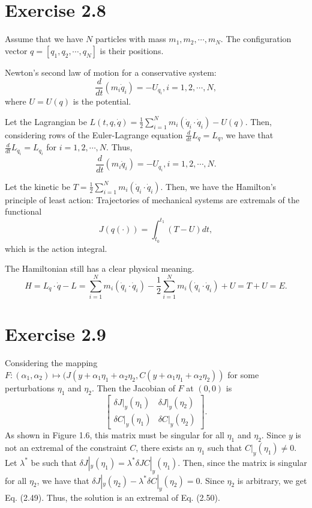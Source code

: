 \documentclass[11pt]{report}
\begin{document}

\section*{Exercise 2.8}
Assume that we have $N$ particles with mass $m_1, m_2, \cdots, m_N$. The configuration vector $q = [q_1, q_2, \cdots, q_N]$ is their positions.

Newton’s second law of motion for a conservative system:
\[
\frac{d}{dt} (m_i\dot{q}_i) = -U_{q_i}, i = 1, 2, \cdots, N,
\]
where $U = U(q)$ is the potential.

Let the Lagrangian be $L(t, q, \dot{q}) = \frac{1}{2}\sum_{i=1}^{N} m_i \left(\dot{q}_i \cdot \dot{q}_i\right) - U(q)$. Then, considering rows of the Euler-Lagrange equation $\frac{d}{dt}L_{\dot{q}} = L_q$, we have that $\frac{d}{dt}L_{\dot{q}_i} = L_{q_i}$ for $i = 1, 2, \cdots, N$. Thus,
\[
\frac{d}{dt} (m_i\dot{q}_i) = -U_{q_i}, i = 1, 2, \cdots, N.
\]

Let the kinetic be $T = \frac{1}{2}\sum_{i=1}^{N} m_i \left(\dot{q}_i \cdot \dot{q}_i\right)$. Then, we have the Hamilton’s principle of least action: Trajectories of mechanical systems are extremals of the functional
\[
J(q(\cdot)) = \int_{t_0}^{t_1} (T - U) dt,
\]
which is the action integral.

The Hamiltonian still has a clear physical meaning.
\[
H = L_{\dot{q}} \cdot \dot{q} - L = \sum_{i=1}^{N} m_i \left(\dot{q}_i \cdot \dot{q}_i\right) - \frac{1}{2}\sum_{i=1}^{N} m_i \left(\dot{q}_i \cdot \dot{q}_i\right) + U = T + U = E.
\]

\section*{Exercise 2.9}
Considering the mapping $F : (\alpha_1, \alpha_2) \mapsto (J(y + \alpha_1 \eta_1 + \alpha_2 \eta_2, C(y + \alpha_1 \eta_1 + \alpha_2 \eta_2))$ for some perturbations $\eta_1$ and $\eta_2$. Then the Jacobian of $F$ at $(0,0)$ is
\[
\begin{bmatrix}
\delta J|_y(\eta_1) & \delta J|_y(\eta_2)\\
\delta C|_y(\eta_1) & \delta C|_y(\eta_2)
\end{bmatrix}.
\]
As shown in Figure 1.6, this matrix must be singular for all $\eta_1$ and $\eta_2$. Since $y$ is not an extremal of the constraint $C$, there exists an $\eta_1$ such that $C|_y(\eta_1) \neq 0$. Let $\lambda^*$ be such that $\delta J|_y(\eta_1) = \lambda^* \delta JC|_y(\eta_1)$. Then, since the matrix is singular for all $\eta_2$, we have that $\delta J|_y(\eta_2) - \lambda^* \delta C|_y(\eta_2) = 0$. Since $\eta_2$ is arbitrary, we get Eq. (2.49). Thus, the solution is an extremal of Eq. (2.50).
\end{document}
